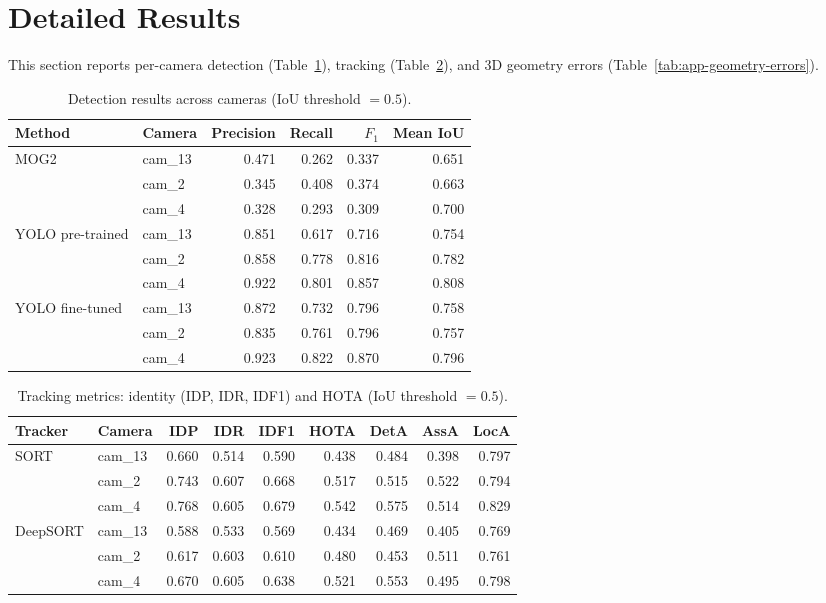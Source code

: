 \section{Detailed Results}\label{app:results}

This section reports per-camera detection (Table~\ref{tab:app-detection}), tracking
(Table~\ref{tab:app-tracking}), and 3D geometry errors
(Table~\ref{tab:app-geometry-errors}).

\begin{table}[H]
\centering
\caption{Detection results across cameras (IoU threshold $=0.5$).}
\label{tab:app-detection}
\small
\begin{tabular}{llrrrr}
\toprule
Method & Camera & Precision & Recall & $F_1$ & Mean IoU \\
\midrule
\multirow{3}{*}{MOG2}
  & cam\_13 & 0.471 & 0.262 & 0.337 & 0.651 \\
  & cam\_2  & 0.345 & 0.408 & 0.374 & 0.663 \\
  & cam\_4  & 0.328 & 0.293 & 0.309 & 0.700 \\
\midrule
\multirow{3}{*}{YOLO pre-trained}
  & cam\_13 & 0.851 & 0.617 & 0.716 & 0.754 \\
  & cam\_2  & 0.858 & 0.778 & 0.816 & 0.782 \\
  & cam\_4  & 0.922 & 0.801 & 0.857 & 0.808 \\
\midrule
\multirow{3}{*}{YOLO fine-tuned}
  & cam\_13 & 0.872 & 0.732 & 0.796 & 0.758 \\
  & cam\_2  & 0.835 & 0.761 & 0.796 & 0.757 \\
  & cam\_4  & 0.923 & 0.822 & 0.870 & 0.796 \\
\bottomrule
\end{tabular}
\end{table}

\begin{table}[H]
\centering
\caption{Tracking metrics: identity (IDP, IDR, IDF1) and HOTA (IoU threshold $=0.5$).}
\label{tab:app-tracking}
\footnotesize
\setlength{\tabcolsep}{4.5pt}
\begin{tabular}{llrrrrrrr}
\toprule
Tracker & Camera & IDP & IDR & IDF1 & HOTA & DetA & AssA & LocA \\
\midrule
\multirow{3}{*}{SORT}
  & cam\_13 & 0.660 & 0.514 & 0.590 & 0.438 & 0.484 & 0.398 & 0.797 \\
  & cam\_2  & 0.743 & 0.607 & 0.668 & 0.517 & 0.515 & 0.522 & 0.794 \\
  & cam\_4  & 0.768 & 0.605 & 0.679 & 0.542 & 0.575 & 0.514 & 0.829 \\
\midrule
\multirow{3}{*}{DeepSORT}
  & cam\_13 & 0.588 & 0.533 & 0.569 & 0.434 & 0.469 & 0.405 & 0.769 \\
  & cam\_2  & 0.617 & 0.603 & 0.610 & 0.480 & 0.453 & 0.511 & 0.761 \\
  & cam\_4  & 0.670 & 0.605 & 0.638 & 0.521 & 0.553 & 0.495 & 0.798 \\
\bottomrule
\end{tabular}
\end{table}

